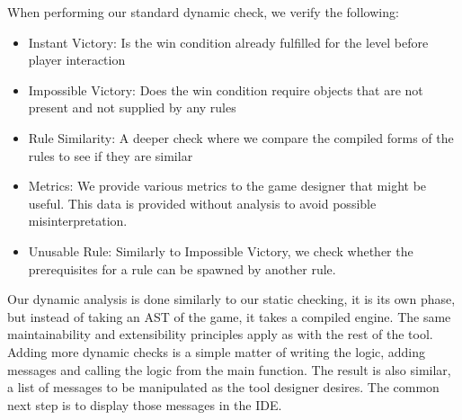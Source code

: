 When performing our standard dynamic check, we verify the following:
\begin{itemize}
    \item Instant Victory: Is the win condition already fulfilled for the level before player interaction
    \item Impossible Victory: Does the win condition require objects that are not present and not supplied by any rules
    \item Rule Similarity: A deeper check where we compare the compiled forms of the rules to see if they are similar
    \item Metrics: We provide various metrics to the game designer that might be useful. This data is provided without analysis to avoid possible misinterpretation. 
    \item Unusable Rule: Similarly to Impossible Victory, we check whether the prerequisites for a rule can be spawned by another rule. 
\end{itemize}

Our dynamic analysis is done similarly to our static checking, it is its own phase, but instead of taking an AST of the game, it takes a compiled engine. The same maintainability and extensibility principles apply as with the rest of the tool. Adding more dynamic checks is a simple matter of writing the logic, adding messages and calling the logic from the main function. The result is also similar, a list of messages to be manipulated as the tool designer desires. The common next step is to display those messages in the IDE.
